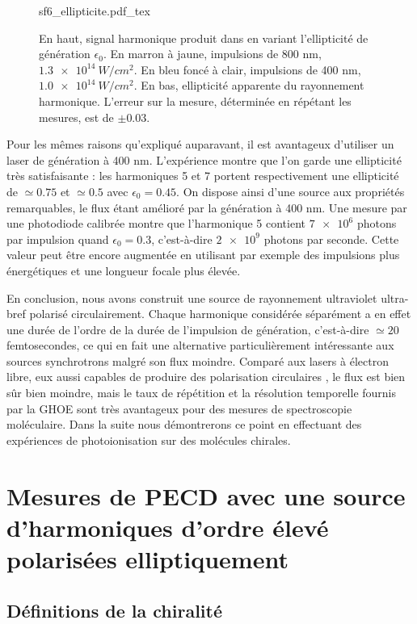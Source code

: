 \begin{figure}[!ht]
\centering
\def\svgwidth{1\columnwidth}
{sf6_ellipticite.pdf_tex}
\caption{En haut, signal harmonique produit dans  en variant l'ellipticité de génération $\epsilon_0$. En marron à jaune, impulsions de 800 nm, $\SI{1.3e14}{W/cm^2}$. En bleu foncé à clair, impulsions de 400 nm, $\SI{1.0e14}{W/cm^2}$. En bas, ellipticité apparente du rayonnement harmonique. L'erreur sur la mesure, déterminée en répétant les mesures, est de $\pm0.03$.}
\label{fig:sf6_ell}
\end{figure}

Pour les mêmes raisons qu'expliqué auparavant, il est avantageux d'utiliser un laser de génération à 400 nm. L'expérience montre que l'on garde une ellipticité très satisfaisante : les harmoniques 5 et 7 portent respectivement une ellipticité de $\simeq 0.75$ et $\simeq 0.5$ avec $\epsilon_0=0.45$. On dispose ainsi d'une source aux propriétés remarquables, le flux étant amélioré par la génération à 400 nm. Une mesure par une photodiode calibrée montre que l'harmonique 5 contient $\num{7e6}$ photons par impulsion quand $\epsilon_0=0.3$, c'est-à-dire $\num{2e9}$ photons par seconde. Cette valeur peut être encore augmentée en utilisant par exemple des impulsions plus énergétiques et une longueur focale plus élevée.

En conclusion, nous avons construit une source de rayonnement ultraviolet ultra-bref polarisé circulairement. Chaque harmonique considérée séparément a en effet une durée de l'ordre de la durée de l'impulsion de génération, c'est-à-dire $\simeq 20$ femtosecondes, ce qui en fait une alternative particulièrement intéressante aux sources synchrotrons malgré son flux moindre. Comparé aux lasers à électron libre, eux aussi capables de produire des polarisation circulaires , le flux est bien sûr bien moindre, mais le taux de répétition et la résolution temporelle fournis par la GHOE sont très avantageux pour des mesures de spectroscopie moléculaire. Dans la suite nous démontrerons ce point en effectuant des expériences de photoionisation sur des molécules chirales. 
%
\chapter{Mesures de PECD avec une source d'harmoniques d'ordre élevé polarisées elliptiquement}
\label{CH:PECD}
\section{Définitions de la chiralité}
